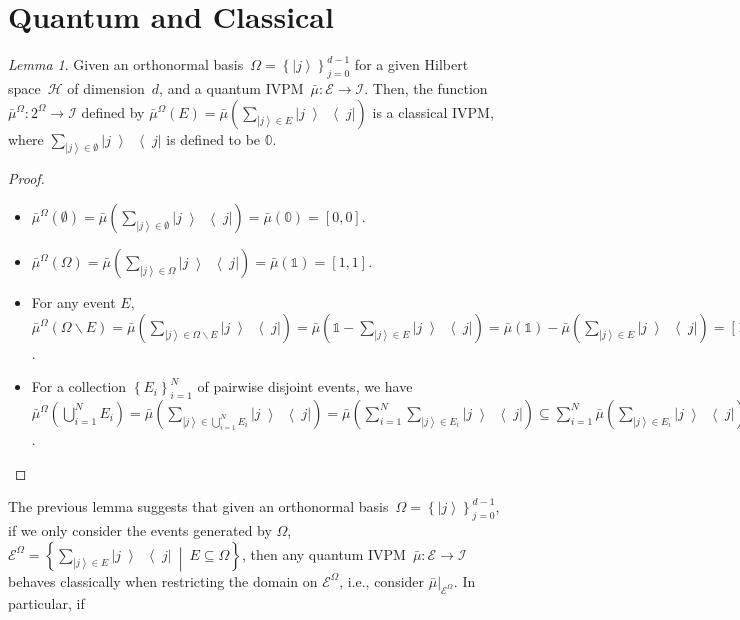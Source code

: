 \documentclass{article}
\theoremstyle{remark}
\newtheorem{lemma}{Lemma}
\newcommand{\Hilb}{\mathcal{H}}
\newcommand{\events}{\ensuremath{\mathcal{E}}}
\newcommand{\ket}[1]{{\left\vert{#1}\right\rangle}}
\newcommand{\op}[2]{\ensuremath{\left\vert{#1}\middle\rangle\middle\langle{#2}\right\vert}}
\newcommand{\proj}[1]{\op{#1}{#1}}
\newcommand{\set}[2]{\ensuremath{\left\{ {#1}~\middle|~{#2}\right\} }}
\begin{document}
\section{Quantum and Classical}

\begin{lemma}Given an orthonormal basis~$\Omega=\left\{ \ket{j}\right\} _{j=0}^{d-1}$
for a given Hilbert space~$\Hilb$ of dimension~$d$, and a quantum
IVPM~$\bar{\mu}:\events\rightarrow\mathscr{I}$. Then, the function
$\bar{\mu}^{\Omega}:2^{\Omega}\rightarrow\mathscr{I}$ defined by
$\bar{\mu}^{\Omega}\left(E\right)=\bar{\mu}\left(\sum_{\ket{j}\in E}\proj{j}\right)$
is a classical IVPM, where $\sum_{\ket{j}\in\emptyset}\proj{j}$ is
defined to be $\mathbb{0}$.\end{lemma}
\begin{proof}
~
\begin{itemize}
\item $\bar{\mu}^{\Omega}(\emptyset)=\bar{\mu}\left(\sum_{\ket{j}\in\emptyset}\proj{j}\right)=\bar{\mu}\left(\mathbb{0}\right)=[0,0]$. 
\item $\bar{\mu}^{\Omega}(\Omega)=\bar{\mu}\left(\sum_{\ket{j}\in\Omega}\proj{j}\right)=\bar{\mu}\left(\mathbb{1}\right)=[1,1]$. 
\item For any event $E$, $\bar{\mu}^{\Omega}\left(\Omega\backslash E\right)=\bar{\mu}\left(\sum_{\ket{j}\in\Omega\backslash E}\proj{j}\right)=\bar{\mu}\left(\mathbb{1}-\sum_{\ket{j}\in E}\proj{j}\right)=\bar{\mu}\left(\mathbb{1}\right)-\bar{\mu}\left(\sum_{\ket{j}\in E}\proj{j}\right)=\left[1,1\right]-\bar{\mu}^{\Omega}\left(E\right)$. 
\item For a collection $\left\{ E_{i}\right\} _{i=1}^{N}$ of pairwise disjoint
events, we have $\bar{\mu}^{\Omega}\left(\bigcup_{i=1}^{N}E_{i}\right)=\bar{\mu}\left(\sum_{\ket{j}\in\bigcup_{i=1}^{N}E_{i}}\proj{j}\right)=\bar{\mu}\left(\sum_{i=1}^{N}\sum_{\ket{j}\in E_{i}}\proj{j}\right)\subseteq\sum_{i=1}^{N}\bar{\mu}\left(\sum_{\ket{j}\in E_{i}}\proj{j}\right)=\sum_{i=1}^{N}\bar{\mu}\left(E_{i}\right)$. 
\end{itemize}
\end{proof}
The previous lemma suggests that given an orthonormal basis~$\Omega=\left\{ \ket{j}\right\} _{j=0}^{d-1}$,
if we only consider the events generated by $\Omega$, $\events^{\Omega}=\set{\sum_{\ket{j}\in E}\proj{j}}{E\subseteq\Omega}$,
then any quantum IVPM~$\bar{\mu}:\events\rightarrow\mathscr{I}$
behaves classically when restricting the domain on $\events^{\Omega}$,
i.e., consider $\bar{\mu}|_{\events^{\Omega}}$. In particular, if
\end{document}
